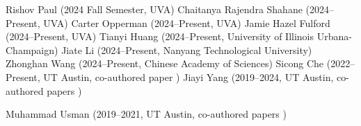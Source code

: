 
 { Rishov Paul (2024 Fall Semester, UVA)}
 { Chaitanya Rajendra Shahane (2024--Present, UVA)}
 {Carter Opperman (2024--Present, UVA)}
 {Jamie Hazel Fulford (2024--Present, UVA)}
 { Tianyi Huang (2024--Present, University of Illinois Urbana-Champaign)}
 { Jiate Li (2024--Present, Nanyang Technological University)}
 { Zhonghan Wang (2024--Present, Chinese Academy of Sciences)}
 {Sicong Che (2022--Present, UT Austin, co-authored paper \cite{learnability})}
 {Jiayi Yang (2019--2024,  UT Austin, co-authored papers \cite{alloymc,learnability})}

 {Muhammad Usman (2019--2021,  UT Austin, co-authored papers \cite{testmc,symmetrystudy,mlmodelstudy,mlrelationstudy,leaninginvariants})}

